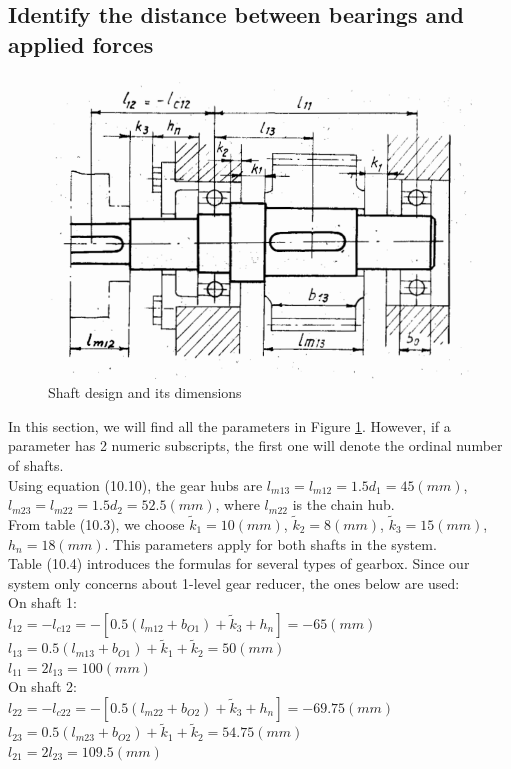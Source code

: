 \subsection{Identify the distance between bearings and applied forces}

\begin{figure}[ht]
	\centering	\includegraphics[width=150mm]{shaft1.png}
	\caption{Shaft design and its dimensions}
	\label{shaft}
\end{figure}

In this section, we will find all the parameters in Figure \ref{shaft}. However, if a parameter has 2 numeric subscripts, the first one will denote the ordinal number of shafts.\\
Using equation (10.10), the gear hubs are $ l_{m13} = l_{m12} = 1.5d_1 =  45\unit{(mm)} $, $ l_{m23} = l_{m22} = 1.5d_2 = 52.5\unit{(mm)} $, where $ l_{m22} $ is the chain hub.\\
From table (10.3), we choose $ \tilde{k}_1=10\unit{(mm)}$, $ \tilde{k}_2=8\unit{(mm)} $, $ \tilde{k}_3=15\unit{(mm)} $, $ h_n=18\unit{(mm)} $. This parameters apply for both shafts in the system.\\
Table (10.4) introduces the formulas for several types of gearbox. Since our system only concerns about 1-level gear reducer, the ones below are used:\\
On shaft 1:\\
$ l_{12} = -l_{c12} = -\left[ 0.5(l_{m12}+b_{O1})+\tilde{k}_3+h_n  \right] = -65 \unit{(mm)} $\\
$ l_{13} = 0.5(l_{m13}+b_{O1})+\tilde{k}_1+\tilde{k}_2 = 50 \unit{(mm)} $\\
$ l_{11} = 2l_{13} = 100 \unit{(mm)}$\\
On shaft 2:\\
$ l_{22} = -l_{c22} = -\left[ 0.5(l_{m22}+b_{O2})+\tilde{k}_3+h_n \right] = -69.75 \unit{(mm)} $\\
$ l_{23} = 0.5(l_{m23}+b_{O2})+\tilde{k}_1+\tilde{k}_2 = 54.75 \unit{(mm)} $\\
$ l_{21} = 2l_{23} = 109.5 \unit{(mm)}$

